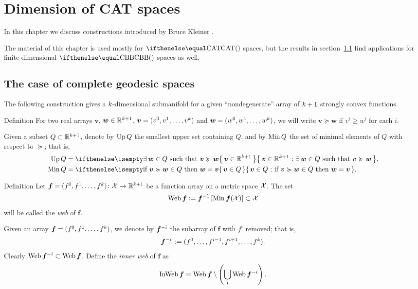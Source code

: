 \chapter{Dimension of CAT spaces}\label{chap:web+bary}

In this chapter we discuss constructions introduced by Bruce Kleiner \cite{kleiner}.

The material of this chapter is used mostly for $\CAT{}$ spaces, 
but the results in section~\ref{sec:web-general} find applications for finite-dimensional $\Alex{}$ spaces as well.

\section{The case of complete geodesic spaces}\label{sec:web-general}

The following construction gives a $k$-dimensional submanifold 
for a given ``nondegenerate'' array of $k+1$ strongly convex functions.

\begin{thm}{Definition}\label{def:ordung}
For two real arrays $\bm{v}$, $\bm{w}\in \RR^{\kay+1}$,
$\bm{v}=(v^0,v^1,\dots,v^\kay)$ 
and 
$\bm{w}\z=(w^0,w^1,\dots,w^\kay)$, 
we will write
$\bm{v}\succcurlyeq\bm{w}$ if $v^i\ge w^i$ for each $i$.
\end{thm}

Given a subset $Q\subset \RR^{\kay+1}$, 
denote by $\mathop{\rm Up}\nolimits Q$ \label{PAGE.def:Up}
the smallest upper set containing $Q$, 
and by 
$\mathop{\rm Min}\nolimits Q$ the set of minimal elements of $Q$ with respect to $\succcurlyeq$;
that is,
\begin{align*}
\Up Q 
&=
\set{\bm{v}\in\RR^{\kay+1}}{\exists\, \bm{w}\in Q\ \text{such that}\ \bm{v}\succcurlyeq\bm{w}},
\\
\Min Q 
&=
\set{\bm{v}\in Q}{\text{if}\ \bm{v}\succcurlyeq\bm{w}\in Q\ \text{then}\ \bm{w}=\bm{v}}.
\end{align*}


\begin{thm}{Definition}\label{def:web}
Let $\bm{f}=(f^0,f^1,\dots,f^\kay)\:\spc{X}\to \RR^{\kay+1}$ be a function array on a metric space $\mathcal{X}$.
The set 
\[\Web\bm{f}
\df
\bm{f}^{-1}\left[\Min\bm{f}(\spc{X})\right]
\subset 
\spc{X}\] 
will be called the \emph{web} of $\bm{f}$.
\end{thm}

Given an array $\bm{f}=(f^0,f^1,\dots,f^\kay)$,
we denote by $\bm{f}^{{-} i}$ the subarray of $\bm{f}$ with $f^i$ removed;
that is, 
\[\bm{f}^{\without i\,}\df(f^0,\dots,f^{i-1},f^{i+1},\dots,f^\kay).\]
Clearly 
$\Web\bm{f}^{\without i}\subset \Web\bm{f}$.
Define the \emph{inner web} of $\bm{f}$ 
as 
\[\mathop{\rm InWeb}\nolimits\bm{f}
=
\mathop{\rm Web}\nolimits\bm{f}\setminus\left(\bigcup_{i}\mathop{\rm Web}\nolimits\bm{f}^{{-} i}\right).\]


